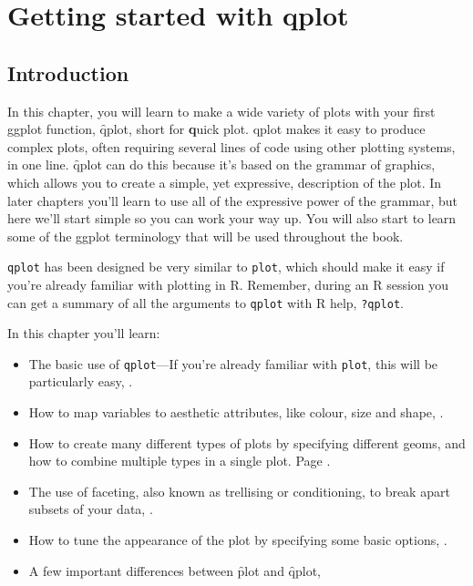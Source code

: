 

% 

%


\chapter{Getting started with qplot}
\label{cha:qplot}

\section{Introduction} 

In this chapter, you will learn to make a wide variety of plots with your first ggplot function, \f{qplot}, short for {\bf q}uick plot. qplot makes it easy to produce complex plots, often requiring several lines of code using other plotting systems, in one line. \f{qplot} can do this because it's based on the grammar of graphics, which allows you to create a simple, yet expressive, description of the plot.  In later chapters you'll learn to use all of the expressive power of the grammar, but here we'll start simple so you can work your way up.  You will also start to learn some of the ggplot terminology that will be used throughout the book.

{\tt qplot} has been designed be very similar to {\tt plot}, which should make it easy if you're already familiar with plotting in R.  Remember, during an R session you can get a summary of all the arguments to {\tt qplot} with R help, {\tt ?qplot}.

In this chapter you'll learn:

\begin{itemize}
  \item The basic use of {\tt qplot}---If you're already familiar with {\tt plot}, this will be particularly easy, .
  \item How to map variables to aesthetic attributes, like colour, size and shape, .
  \item How to create many different types of plots by specifying different geoms, and how to combine multiple types in a single plot. Page .
  \item The use of faceting, also known as trellising or conditioning, to break apart subsets of your data, .
  \item How to tune the appearance of the plot by specifying some basic options, .
  \item A few important differences between \f{plot} and \f{qplot}, 
\end{itemize}

